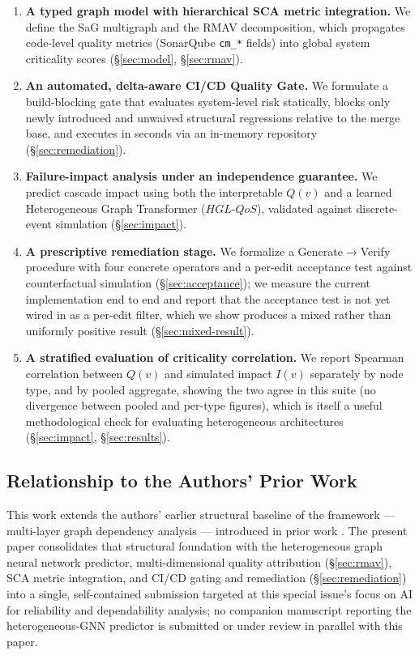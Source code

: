 \documentclass[review]{elsarticle}
\begin{document}
\begin{enumerate}
\item \textbf{A typed graph model with hierarchical SCA metric integration.} We define the SaG
  multigraph and the RMAV decomposition, which propagates code-level quality metrics (SonarQube
  \texttt{cm\_*} fields) into global system criticality scores (\S\ref{sec:model}, \S\ref{sec:rmav}).
\item \textbf{An automated, delta-aware CI/CD Quality Gate.} We formulate a build-blocking gate that
  evaluates system-level risk statically, blocks only newly introduced and unwaived structural
  regressions relative to the merge base, and executes in seconds via an in-memory repository
  (\S\ref{sec:remediation}).
\item \textbf{Failure-impact analysis under an independence guarantee.} We predict cascade impact
  using both the interpretable $Q(v)$ and a learned Heterogeneous Graph Transformer
  ($HGL\text{-}QoS$), validated against discrete-event simulation (\S\ref{sec:impact}).
\item \textbf{A prescriptive remediation stage.} We formalize a Generate$\to$Verify procedure with
  four concrete operators and a per-edit acceptance test against counterfactual simulation
  (\S\ref{sec:acceptance}); we measure the current implementation end to end and report that the
  acceptance test is not yet wired in as a per-edit filter, which we show produces a mixed rather
  than uniformly positive result (\S\ref{sec:mixed-result}).
\item \textbf{A stratified evaluation of criticality correlation.} We report Spearman correlation
  between $Q(v)$ and simulated impact $I(v)$ separately by node type, and by pooled aggregate,
  showing the two agree in this suite (no divergence between pooled and per-type figures), which is
  itself a useful methodological check for evaluating heterogeneous architectures
  (\S\ref{sec:impact}, \S\ref{sec:results}).
\end{enumerate}

\subsection{Relationship to the Authors' Prior Work}

This work extends the authors' earlier structural baseline of the framework --- multi-layer graph
dependency analysis --- introduced in prior work \cite{AnonA}. The present paper consolidates that
structural foundation with the heterogeneous graph neural network predictor, multi-dimensional
quality attribution (\S\ref{sec:rmav}), SCA metric integration, and CI/CD gating and remediation
(\S\ref{sec:remediation}) into a single, self-contained submission targeted at this special issue's
focus on AI for reliability and dependability analysis; no companion manuscript reporting the
heterogeneous-GNN predictor is submitted or under review in parallel with this paper.
\end{document}
